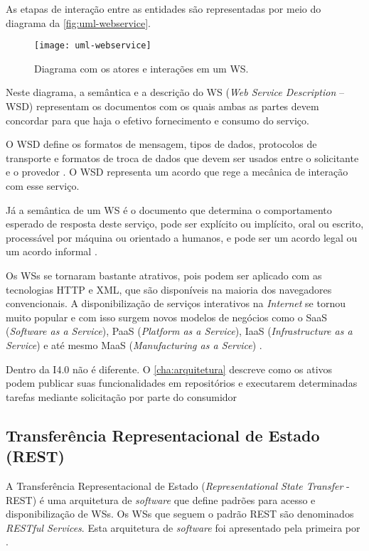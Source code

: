 As etapas de interação entre as entidades são representadas por meio do diagrama da \autoref{fig:uml-webservice}.

\begin{figure}[t]
	\centering
	\texttt{[image: uml-webservice]}
	\caption{Diagrama com os atores e interações em um WS.}
	\label{fig:uml-webservice}
\end{figure}

Neste diagrama, a semântica e a descrição do WS (\textit{Web Service Description} -- WSD) representam os documentos com os quais ambas as partes devem concordar para que haja o efetivo fornecimento e consumo do serviço.

O WSD define os formatos de mensagem, tipos de dados, protocolos de transporte e formatos de troca de dados que devem ser usados entre o solicitante e o provedor \cite{booth2004webservice}. O WSD representa um acordo que rege a mecânica de interação com esse serviço.

Já a semântica de um WS é o documento que determina o comportamento esperado de resposta deste serviço, pode ser explícito ou implícito, oral ou escrito, processável por máquina ou orientado a humanos, e pode ser um acordo legal ou um acordo informal \cite{booth2004webservice}.

Os WSs se tornaram bastante atrativos, pois podem ser aplicado com as tecnologias HTTP e XML, que são disponíveis na maioria dos navegadores convencionais. A disponibilização de serviços interativos na \textit{Internet} se tornou muito popular e com isso surgem novos modelos de negócios como o SaaS (\textit{Software as a Service}), PaaS (\textit{Platform as a Service}), IaaS (\textit{Infrastructure as a Service}) e até mesmo MaaS (\textit{Manufacturing as a Service}) \cite{annunziata2019maas, nichols2020maas, siepen2019maas}.

Dentro da I4.0 não é diferente. O \autoref{cha:arquitetura} descreve como os ativos podem publicar suas funcionalidades em repositórios e executarem determinadas tarefas mediante solicitação por parte do consumidor

\subsection{Transferência Representacional de Estado (REST)}

A Transferência Representacional de Estado (\textit{Representational State Transfer} - REST) é uma arquitetura de \textit{software} que define padrões para acesso e disponibilização de WSs. Os WSs que seguem o padrão REST são denominados \textit{RESTful Services}. Esta arquitetura de \textit{software} foi apresentado pela primeira por .

